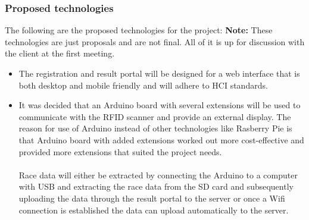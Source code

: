 \documentclass{article}
\begin{document}
        \subsubsection{Proposed technologies}
		The following are the proposed technologies for the project:\newline
		\textbf{Note:} These technologies are just proposals and are not final. All of it is up for discussion with the client at the first meeting.
         \begin{itemize}
         	\item The registration and result portal will be designed for a web interface that is both desktop and mobile friendly and will adhere to HCI standards.
         	\item It was decided that an Arduino board with several extensions will be used to communicate with the RFID scanner and provide an external display. The reason for use of Arduino instead of other technologies like Rasberry Pie is that Arduino board with added extensions worked out more cost-effective and provided more extensions that suited the project needs.\\
			\\Race data will either be extracted by connecting the Arduino to a computer with USB and extracting the race data from the SD card and subsequently uploading the data through the result portal to the server or once a Wifi connection is established the data can upload automatically to the server.\\        	
         	

\end{itemize}
\end{document}
